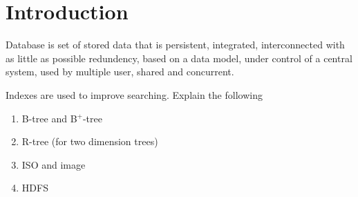 \chapter{Introduction}
Database is set of stored data that is persistent, integrated, interconnected with as little as possible redundency, based on a data model, under control of a central system, used by multiple user, shared and concurrent.

Indexes are used to improve searching. Explain the following 
\begin{enumerate}
    \item B-tree and B\(^+\)-tree 
    \item R-tree (for two dimension trees)
    \item ISO and image
    \item HDFS
\end{enumerate}